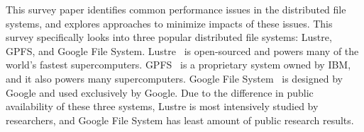 This survey paper identifies common performance issues in 
the distributed file systems, 
and explores approaches to minimize impacts of these issues.
%
This survey specifically looks into three popular distributed 
file systems: Lustre, GPFS, and Google File System.
%
Lustre~\cite{Schwan2003} is open-sourced and powers many of the 
world's fastest supercomputers.
%
GPFS~\cite{Schmuck2002}\cite{barkes1998gpfs} is a proprietary system owned by IBM, and
it also powers many supercomputers.
%
Google File System~\cite{ghemawat2003google} is designed by Google and used 
exclusively by Google.
%
Due to the difference in public availability of these three systems,
Lustre is most intensively studied by researchers, 
and Google File System has least amount of public research results.
